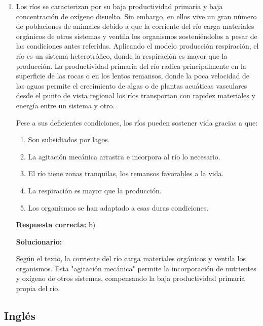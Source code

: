 \begin{enumerate}[resume]
	\item Los ríos se caracterizan por su baja productividad primaria y baja concentración de oxígeno disuelto. Sin embargo, en ellos vive un gran número de poblaciones de animales debido a que la corriente del río carga materiales orgánicos de otros sistemas y ventila los organismos sosteniéndolos a pesar de las condiciones antes referidas. Aplicando el modelo producción  respiración, el río es un sistema heterotrófico, donde la respiración es mayor que la producción. La productividad primaria del río radica principalmente en la superficie de las rocas o en los lentos remansos, donde la poca velocidad de las aguas permite el crecimiento de algas o de plantas acuáticas vasculares desde el punto de vista regional los ríos transportan con rapidez materiales y energía entre un sistema y otro.
	
	Pese a sus deficientes condiciones, los ríos pueden sostener vida gracias a que:
	
	\begin{enumerate}[label=\alph*)]
		\item Son subsidiados por lagos.
		\item La agitación mecánica arrastra e incorpora al río lo necesario.
		\item El río tiene zonas tranquilas, los remansos favorables a la vida.
		\item La respiración es mayor que la producción.
		\item Los organismos se han adaptado a esas duras condiciones.
	\end{enumerate}
	
	\textbf{Respuesta correcta:} b)
	
	\vspace{2mm}
	\textbf{Solucionario:}
	
	Según el texto, la corriente del río carga materiales orgánicos y ventila los organismos. Esta "agitación mecánica" permite la incorporación de nutrientes y oxígeno de otros sistemas, compensando la baja productividad primaria propia del río.
	
	\vspace{6mm}
	
\end{enumerate}


\subsection*{Inglés}

